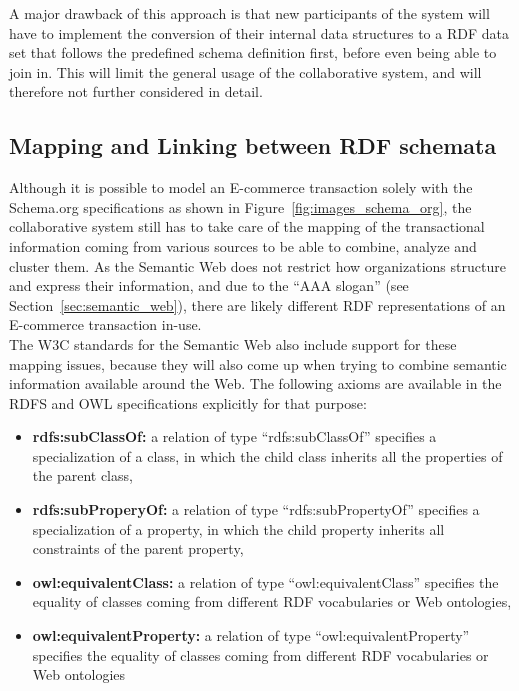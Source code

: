A major drawback of this approach is that new participants of the system will have to implement the conversion of their internal data structures to a \gls{RDF} data set that follows the predefined schema definition first, before even being able to join in. This will limit the general usage of the collaborative system, and will therefore not further considered in detail.


\subsection{Mapping and Linking between \gls{RDF} schemata}

Although it is possible to model an \gls{E-commerce} transaction solely with the Schema.org specifications as shown in Figure~\ref{fig:images_schema_org}, the collaborative system still has to take care of the mapping of the transactional information coming from various sources to be able to combine, analyze and cluster them. As the Semantic Web does not restrict how organizations structure and express their information, and due to the ``AAA slogan'' (see Section~\ref{sec:semantic_web}), there are likely different \gls{RDF} representations of an \gls{E-commerce} transaction in-use. \\

The \gls{W3C} standards for the Semantic Web also include support for these mapping issues, because they will also come up when trying to combine semantic information available around the Web. The following axioms are available in the \gls{RDFS} and \gls{OWL} specifications explicitly for that purpose: \@

\begin{itemize}
	\item \textbf{rdfs:subClassOf:} a relation of type ``rdfs:subClassOf'' specifies a specialization of a class, in which the child class inherits all the properties of the parent class,
  \item \textbf{rdfs:subProperyOf:} a relation of type ``rdfs:subPropertyOf'' specifies a specialization of a property, in which the child property inherits all constraints of the parent property,
  \item \textbf{owl:equivalentClass:} a relation of type ``owl:equivalentClass'' specifies the equality of classes coming from different \gls{RDF} vocabularies or Web ontologies,
  \item \textbf{owl:equivalentProperty:} a relation of type ``owl:equivalentProperty'' specifies the equality of classes coming from different \gls{RDF} vocabularies or Web ontologies
\end{itemize}

